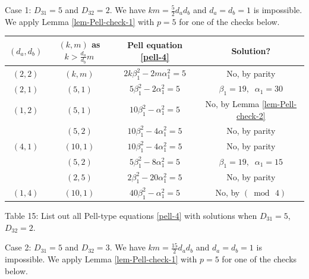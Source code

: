 \documentclass[12pt]{article}
\begin{document}
\bigskip

Case 1: $D_{31} = 5$ and $D_{32} = 2$. We have $k m = \frac{5}{2} d_a d_b$ and $d_a = d_b = 1$ is impossible. We apply Lemma \ref{lem-Pell-check-1} with $p = 5$ for one of the checks below.

\begin{center}
\begin{tabular}{|c|c|c|c|}
\hline $(d_a, d_b)$ & $(k, m)$ as $k > \frac{d_a}{d_b} m$ & Pell equation \eqref{pell-4} & Solution? \\
\hline $(2,2)$ & $(k, m)$ & $2 k \beta_1^2- 2 m \alpha_1^2=5$ & No, by parity\\
\hline $(2,1)$ & $(5,1)$ & $5\beta_1^2-2\alpha_1^2=5$ & $\beta_1=19, \; \; \alpha_1=30$\\
\hline $(1,2)$ & $(5,1)$ & $10\beta_1^2-\alpha_1^2=5$ & No, by Lemma \ref{lem-Pell-check-2} \\
\hline & $(5,2)$ & $10\beta_1^2-4\alpha_1^2=5$ & No, by parity\\
\hline $(4,1)$ & $(10,1)$ & $10\beta_1^2-4\alpha_1^2=5$ & No, by parity\\
\hline & $(5,2)$ & $5\beta_1^2-8\alpha_1^2=5$ & $\beta_1=19, \; \; \alpha_1=15$\\
\hline & $(2,5)$ & $2\beta_1^2-20\alpha_1^2=5$ & No, by parity\\
\hline $(1,4)$ & $(10,1)$ & $40\beta_1^2-\alpha_1^2=5$ & No, by $(\bmod \, 4)$\\
\hline
\end{tabular}
\newline \small{Table 15: List out all Pell-type equations \eqref{pell-4} with solutions when $D_{31} = 5$, $D_{32} = 2$.}
\end{center}

Case 2: $D_{31} = 5$ and $D_{32} = 3$. We have $k m = \frac{15}{2} d_a d_b$ and $d_a = d_b = 1$ is impossible. We apply Lemma \ref{lem-Pell-check-1} with $p = 5$ for one of the checks below.
\end{document}

